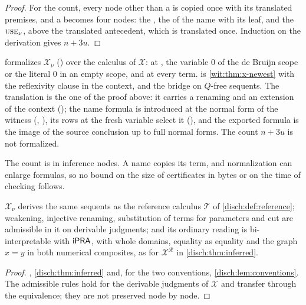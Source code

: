 \begin{proof}
For the count, every node other than a  is copied once with
its translated premises, and a  becomes four nodes: the
, the  of the name with its 
leaf, and the $\rulename{Use}_\nu$, above the translated antecedent, which
is translated once.  Induction on the derivation gives $n+3u$.
\end{proof}

\begin{remark}
\label{wit:rem:x-lean}
 formalizes $\mathcal X_\nu$ () over the
calculus  of $\mathcal X$:  at ,
the variable $0$ of the de Bruijn scope or the literal $0$ in an empty scope,
and  at every term.   is
\cref{wit:thm:x-newest} with the reflexivity clause in the context, and
 the bridge on $Q$-free sequents.  The
translation is the one of the proof above: it carries a renaming and an
extension of the context (); the name formula is introduced
at the normal form of the witness (, ),
its rows at the fresh variable select it (), and the
exported formula is the image of the source conclusion up to full normal
forms.  The count $n+3u$ is not formalized.
\end{remark}

The count is in inference nodes.  A name copies its term, and normalization
can enlarge formulas, so no bound on the size of certificates in bytes or
on the time of checking follows.

\begin{corollary}
\label{wit:cor:x-bridge}
$\mathcal X_\nu$ derives the same sequents as the reference calculus
$\mathcal T$ of \cref{disch:def:reference}; weakening, injective renaming,
substitution of terms for parameters and cut are admissible in it on
derivable judgments; and its ordinary reading is bi-interpretable with
$\mathsf{iPRA}$, with whole domains, equality as equality and the graph $x=y$ in
both numerical composites, as for $\mathcal X^{\mathcal R}$ in
\cref{disch:thm:inferred}.
\end{corollary}

\begin{proof}
, \cref{disch:thm:inferred} and, for the two
conventions, \cref{disch:lem:conventions}.  The admissible
rules hold for the derivable judgments of $\mathcal X$ and transfer through
the equivalence; they are not preserved node by node.
\end{proof}

